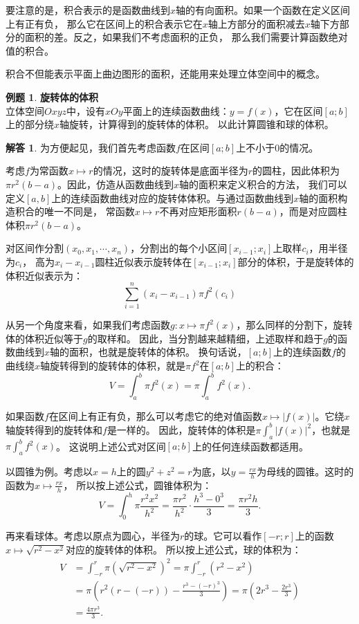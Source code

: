 \documentclass[12pt,UTF8]{ctexbook}
\theoremstyle{definition}
\newtheorem{et}{例题}[section]
\newtheorem*{so}{解答}
\theoremstyle{plain}
\begin{document}
要注意的是，积合表示的是函数曲线到$x$轴的有向面积。如果一个函数在定义区间上有正有负，
那么它在区间上的积合表示它在$x$轴上方部分的面积减去$x$轴下方部分的面积的差。反之，如果我们不考虑面积的正负，
那么我们需要计算函数绝对值的积合。

积合不但能表示平面上曲边图形的面积，还能用来处理立体空间中的概念。

\begin{et}{\textbf{旋转体的体积}}\\
    立体空间$Oxyz$中，设有$xOy$平面上的连续函数曲线：$y = f(x)$，它在区间$[a;b]$上的部分绕$x$轴旋转，计算得到的旋转体的体积。
    以此计算圆锥和球的体积。
\end{et}

\begin{so}
    为方便起见，我们首先考虑函数$f$在区间$[a;b]$上不小于$0$的情况。

    考虑$f$为常函数$x\mapsto r$的情况，这时的旋转体是底面半径为$r$的圆柱，因此体积为$\pi r^2 (b - a)$。因此，仿造从函数曲线到$x$轴的面积来定义积合的方法，
    我们可以定义$[a,b]$上的连续函数曲线对应的旋转体体积。与通过函数曲线到$x$轴的面积构造积合的唯一不同是，
    常函数$x\mapsto r$不再对应矩形面积$r(b - a)$，而是对应圆柱体积$\pi r^2 (b - a)$。
    
    对区间作分割$(x_0, x_1, \cdots, x_n)$，分割出的每个小区间$[x_{i-1};x_i]$上取样$c_i$，用半径为$c_i$，
    高为$x_i - x_{i-1}$圆柱近似表示旋转体在$[x_{i-1};x_i]$部分的体积，于是旋转体的体积近似表示为：
    $$ \sum_{i=1}^n (x_i - x_{i-1}) \pi f^2(c_i) $$

    从另一个角度来看，如果我们考虑函数$g: x\mapsto \pi f^2(x)$，那么同样的分割下，旋转体的体积近似等于$g$的取样和。
    因此，当分割越来越精细，上述取样和趋于$g$的函数曲线到$x$轴的面积，也就是旋转体的体积。
    换句话说，$[a;b]$上的连续函数$f$的曲线绕$x$轴旋转得到的旋转体的体积，就是$\pi f^2$在$[a;b]$上的积合：
    $$ V = \int_a^b \pi f^2(x) = \pi \int_a^b f^2(x). $$

    如果函数$f$在区间上有正有负，那么可以考虑它的绝对值函数$x\mapsto |f(x)|$。它绕$x$轴旋转得到的旋转体和$f$是一样的。
    因此，旋转体的体积是$ \pi \int_a^b |f(x)|^2$，也就是$ \pi \int_a^b f^2(x)$。
    这说明上述公式对区间$[a;b]$上的任何连续函数都适用。

    以圆锥为例。考虑以$x = h$上的圆$y^2 + z^2 = r$为底，以$y = \frac{rx}{h}$为母线的圆锥。这时的函数为$x\mapsto \frac{rx}{h}$，
    所以按上述公式，圆锥体积为：
    $$ V = \int_0^h \pi \frac{r^2x^2}{h^2} = \frac{\pi r^2}{h^2}\cdot \frac{h^3 - 0^3}{3} = \frac{\pi r^2h}{3}. $$

    再来看球体。考虑以原点为圆心，半径为$r$的球。它可以看作$[-r;r]$上的函数$x\mapsto \sqrt{r^2 - x^2}$对应的旋转体的体积。
    所以按上述公式，球的体积为：
    \begin{align*}
        V &= \int_{-r}^r \pi \left(\sqrt{r^2 - x^2}\right)^2 = \pi \int_{-r}^r \left(r^2 - x^2\right) \\
        &= \pi \left(r^2(r - (-r)) - \frac{r^3 - (-r)^3}{3}\right) = \pi \left(2r^3 - \frac{2r^3}{3}\right) \\
        &= \frac{4\pi r^3}{3}.
    \end{align*}
\end{so}
\end{document}
